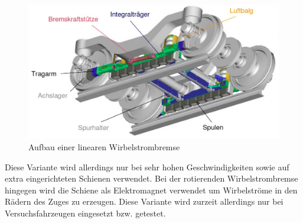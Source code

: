 \begin{figure}
  \includegraphics[width=\textwidth]{Wirbelstrombremse_Aufbau.jpg}
  \caption{Aufbau einer linearen Wirbelstrombremse}
  \label{fig:linWAufbau}
\end{figure}

Diese Variante
wird allerdings nur bei sehr hohen Geschwindigkeiten sowie auf extra eingerichteten
Schienen verwendet.
Bei der rotierenden Wirbelstrombremse hingegen wird die Schiene als Elektromagnet
verwendet um Wirbelströme in den Rädern des Zuges zu erzeugen. Diese Variante wird
zurzeit allerdings nur bei Versuchsfahrzeugen eingesetzt bzw. getestet.



